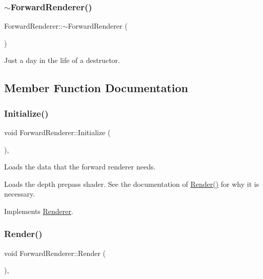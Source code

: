 \subsubsection{\texorpdfstring{$\sim$\+Forward\+Renderer()}{~ForwardRenderer()}}
{\footnotesize\ttfamily Forward\+Renderer\+::$\sim$\+Forward\+Renderer (\begin{DoxyParamCaption}{ }\end{DoxyParamCaption})\hspace{0.3cm}{\ttfamily [virtual]}}



Just a day in the life of a destructor.



\subsection{Member Function Documentation}
\hypertarget{class_forward_renderer_a5cbca647822780d6cfbd39552d73ee06}{}\label{class_forward_renderer_a5cbca647822780d6cfbd39552d73ee06}
\subsubsection{\texorpdfstring{Initialize()}{Initialize()}}
{\footnotesize\ttfamily void Forward\+Renderer\+::\+Initialize (\begin{DoxyParamCaption}{ }\end{DoxyParamCaption})\hspace{0.3cm}{\ttfamily [override]}, {\ttfamily [virtual]}}



Loads the data that the forward renderer needs.

Loads the depth prepass shader. See the documentation of \hyperlink{class_forward_renderer_a1a5deafa5deaf1e0abaab0e2074928c1}{Render()} for why it is necessary.

Implements \hyperlink{class_renderer_a7cb221f355f181d84d66e8c09f50f04a}{Renderer}.

\hypertarget{class_forward_renderer_a1a5deafa5deaf1e0abaab0e2074928c1}{}\label{class_forward_renderer_a1a5deafa5deaf1e0abaab0e2074928c1}
\subsubsection{\texorpdfstring{Render()}{Render()}}
{\footnotesize\ttfamily void Forward\+Renderer\+::\+Render (\begin{DoxyParamCaption}{ }\end{DoxyParamCaption})\hspace{0.3cm}{\ttfamily [override]}, {\ttfamily [virtual]}}



